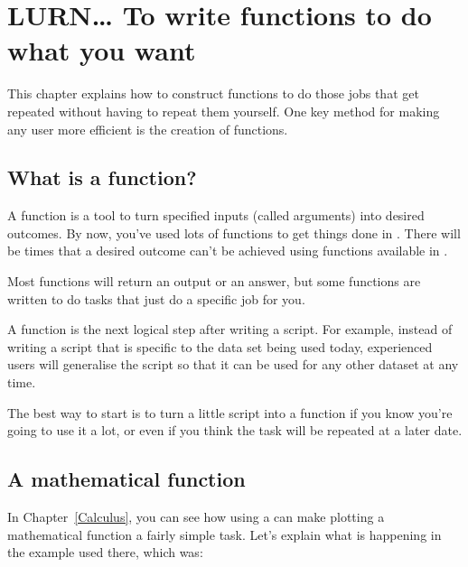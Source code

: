 

\chapter{LURN\ldots{} To write functions to do what you want} 
\label{Functions} 
 



 
This chapter explains how to construct functions to do those jobs that get repeated without having to repeat them yourself. One key method for making any \R{} user more efficient is the creation of functions.  
 
\section{What is a function?} 
 
A function is a tool to turn specified inputs (called arguments) into desired outcomes. By now, you've used lots of functions to get things done in \R{}. There will be times that a desired outcome can't be achieved using functions available in \R{}.  
 
Most functions will return an output or an answer, but some functions are written to do tasks that just do a specific job for you. 
 
A function is the next logical step after writing a script. For example, instead of writing a script that is specific to the data set being used today, experienced \R{} users will generalise the script so that it can be used for any other dataset at any time.  
  
The best way to start is to turn a little script into a function if you know you're going to use it a lot, or even if you think the task will be repeated at a later date. 
 
 
\section{A mathematical function} 
 
In Chapter~\ref{Calculus}, you can see how using a  can make plotting a mathematical function a fairly simple task. Let's explain what is happening in the example used there, which was: 

